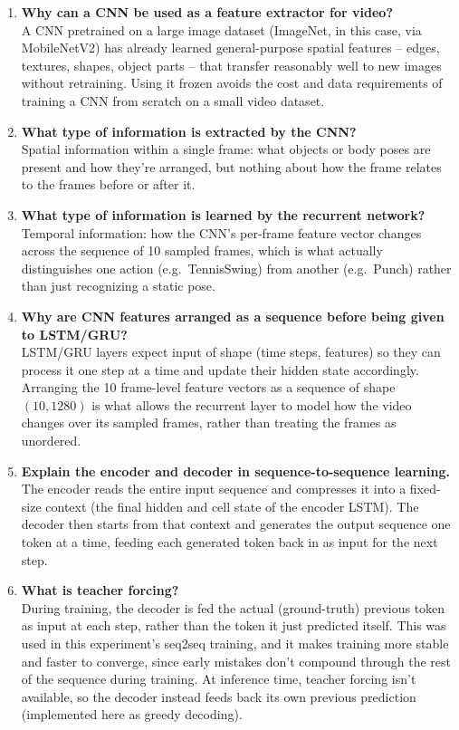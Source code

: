 \documentclass[10pt]{article}
\begin{document}
\begin{enumerate}
\item \textbf{Why can a CNN be used as a feature extractor for video?}\\
A CNN pretrained on a large image dataset (ImageNet, in this case, via
MobileNetV2) has already learned general-purpose spatial features -- edges,
textures, shapes, object parts -- that transfer reasonably well to new
images without retraining. Using it frozen avoids the cost and data
requirements of training a CNN from scratch on a small video dataset.

\item \textbf{What type of information is extracted by the CNN?}\\
Spatial information within a single frame: what objects or body poses are
present and how they're arranged, but nothing about how the frame relates
to the frames before or after it.

\item \textbf{What type of information is learned by the recurrent network?}\\
Temporal information: how the CNN's per-frame feature vector changes
across the sequence of 10 sampled frames, which is what actually
distinguishes one action (e.g.\ TennisSwing) from another (e.g.\ Punch)
rather than just recognizing a static pose.

\item \textbf{Why are CNN features arranged as a sequence before being given to LSTM/GRU?}\\
LSTM/GRU layers expect input of shape (time steps, features) so they can
process it one step at a time and update their hidden state accordingly.
Arranging the 10 frame-level feature vectors as a sequence of shape
$(10, 1280)$ is what allows the recurrent layer to model how the video
changes over its sampled frames, rather than treating the frames as
unordered.

\item \textbf{Explain the encoder and decoder in sequence-to-sequence learning.}\\
The encoder reads the entire input sequence and compresses it into a
fixed-size context (the final hidden and cell state of the encoder LSTM).
The decoder then starts from that context and generates the output
sequence one token at a time, feeding each generated token back in as
input for the next step.

\item \textbf{What is teacher forcing?}\\
During training, the decoder is fed the actual (ground-truth) previous
token as input at each step, rather than the token it just predicted
itself. This was used in this experiment's seq2seq training, and it makes
training more stable and faster to converge, since early mistakes don't
compound through the rest of the sequence during training. At inference
time, teacher forcing isn't available, so the decoder instead feeds back
its own previous prediction (implemented here as greedy decoding).


\end{enumerate}
\end{document}
